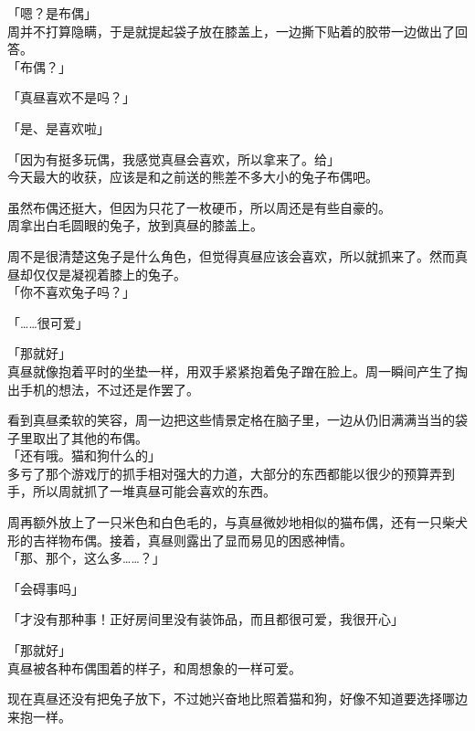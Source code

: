 「嗯？是布偶」\\

周并不打算隐瞒，于是就提起袋子放在膝盖上，一边撕下贴着的胶带一边做出了回答。\\

「布偶？」

「真昼喜欢不是吗？」

「是、是喜欢啦」

「因为有挺多玩偶，我感觉真昼会喜欢，所以拿来了。给」\\

今天最大的收获，应该是和之前送的熊差不多大小的兔子布偶吧。

虽然布偶还挺大，但因为只花了一枚硬币，所以周还是有些自豪的。\\

周拿出白毛圆眼的兔子，放到真昼的膝盖上。

周不是很清楚这兔子是什么角色，但觉得真昼应该会喜欢，所以就抓来了。然而真昼却仅仅是凝视着膝上的兔子。\\

「你不喜欢兔子吗？」

「……很可爱」

「那就好」\\

真昼就像抱着平时的坐垫一样，用双手紧紧抱着兔子蹭在脸上。周一瞬间产生了掏出手机的想法，不过还是作罢了。

看到真昼柔软的笑容，周一边把这些情景定格在脑子里，一边从仍旧满满当当的袋子里取出了其他的布偶。\\

「还有哦。猫和狗什么的」\\

多亏了那个游戏厅的抓手相对强大的力道，大部分的东西都能以很少的预算弄到手，所以周就抓了一堆真昼可能会喜欢的东西。

周再额外放上了一只米色和白色毛的，与真昼微妙地相似的猫布偶，还有一只柴犬形的吉祥物布偶。接着，真昼则露出了显而易见的困惑神情。\\

「那、那个，这么多……？」

「会碍事吗」

「才没有那种事！正好房间里没有装饰品，而且都很可爱，我很开心」

「那就好」\\

真昼被各种布偶围着的样子，和周想象的一样可爱。

现在真昼还没有把兔子放下，不过她兴奋地比照着猫和狗，好像不知道要选择哪边来抱一样。\\

